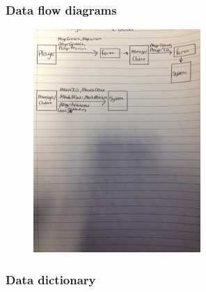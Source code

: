 \subsubsection{Data flow diagrams}
\begin{figure}[H]
	\includegraphics{Data flow}
\end{figure}

\subsubsection{Data dictionary}

